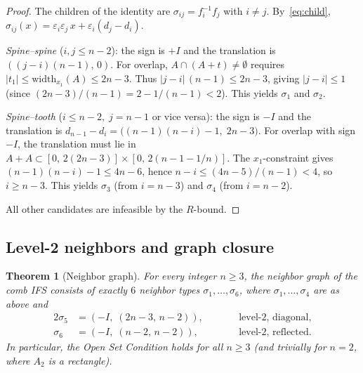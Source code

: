 \documentclass{amsart}
\newtheorem{theorem}{Theorem}[section]
\theoremstyle{definition}
\theoremstyle{remark}
\begin{document}
\begin{proof}
The children of the identity are $\sigma_{ij} = f_i^{-1} f_j$
with $i \ne j$.  By~\eqref{eq:child},
$\sigma_{ij}(x) = \varepsilon_i\varepsilon_j\, x
  + \varepsilon_i(d_j - d_i)$.

\emph{Spine--spine} ($i, j \le n{-}2$): the sign is $+I$ and the
translation is $((j{-}i)(n{-}1),\, 0)$.
For overlap, $A \cap (A + t) \ne \emptyset$ requires
$|t_1| \le \mathrm{width}_{x_1}(A) \le 2n{-}3$.  Thus
$|j{-}i|\,(n{-}1) \le 2n{-}3$, giving $|j{-}i| \le 1$ (since
$(2n{-}3)/(n{-}1) = 2 - 1/(n{-}1) < 2$).  This yields
$\sigma_1$ and $\sigma_2$.

\emph{Spine--tooth} ($i \le n{-}2,\; j = n{-}1$ or vice versa):
the sign is $-I$ and the translation is
$d_{n-1} - d_i = \bigl((n{-}1)(n{-}i) - 1,\; 2n{-}3\bigr)$.
For overlap with sign $-I$, the translation must lie in
$A + A \subset [0,\, 2(2n{-}3)] \times [0,\, 2(n{-}1{-}1/n)]$.
The $x_1$-constraint gives $(n{-}1)(n{-}i) - 1 \le 4n{-}6$,
hence $n{-}i \le (4n{-}5)/(n{-}1) < 4$, so $i \ge n{-}3$.
This yields $\sigma_3$ (from $i = n{-}3$) and $\sigma_4$ (from
$i = n{-}2$).

All other candidates are infeasible by the $R$-bound.
\end{proof}

\subsection{Level-2 neighbors and graph closure}

\begin{theorem}[Neighbor graph]\label{thm:graph}
For every integer $n \ge 3$, the neighbor graph of the comb IFS consists
of exactly $6$ neighbor types $\sigma_1, \ldots, \sigma_6$, where
$\sigma_1, \ldots, \sigma_4$ are as above and
\begin{alignat*}{2}
  \sigma_5 &= (-I,\; (2n{-}3,\, n{-}2)),
    &\qquad& \text{level-2, diagonal}, \\
  \sigma_6 &= (-I,\; (n{-}2,\, n{-}2)),
    &\qquad& \text{level-2, reflected}.
\end{alignat*}
In particular, the Open Set Condition holds for all $n \ge 3$
(and trivially for $n = 2$, where $A_2$ is a rectangle).
\end{theorem}
\end{document}
